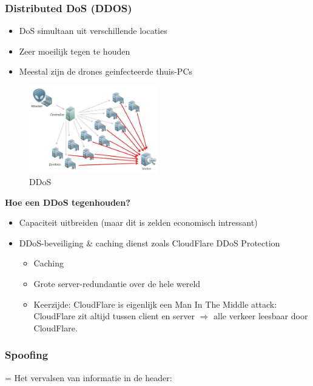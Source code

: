 \documentclass{article}
\newcommand{\bold}[1]{\textbf{#1}}
\begin{document}
\subsubsection{Distributed DoS (DDOS)}

\begin{itemize}
    \item DoS simultaan uit verschillende locaties
    \item Zeer moeilijk tegen te houden
    \item Meestal zijn de drones geinfecteerde thuis-PCs
\end{itemize}

\begin{figure}[H]
    \centering
    \includegraphics[width=0.5\textwidth]{ddos.png}
    \caption{DDoS}
\end{figure}

\bold{Hoe een DDoS tegenhouden?}

\begin{itemize}
    \item Capaciteit uitbreiden (maar dit is zelden economisch intressant)
    \item DDoS-beveiliging \& caching dienst zoals CloudFlare DDoS Protection
    \begin{itemize}
        \item Caching
        \item Grote server-redundantie over de hele wereld
        \item Keerzijde: CloudFlare is eigenlijk een Man In The Middle attack: CloudFlare zit altijd tussen client en server $\Rightarrow$ alle verkeer leesbaar door CloudFlare.
    \end{itemize}
\end{itemize}

\subsubsection{Spoofing}

= Het vervalsen van informatie in de header:
\end{document}
